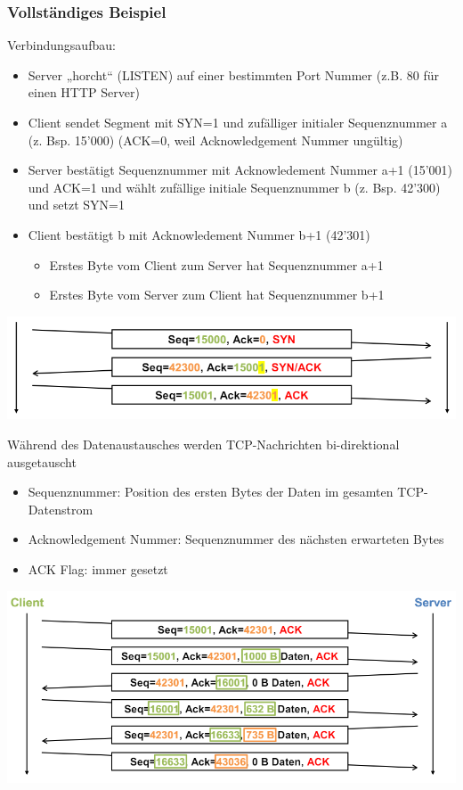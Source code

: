 \subsubsection*{Vollständiges Beispiel}

\begin{example}
    Verbindungsaufbau:
    \begin{itemize}
        \item Server „horcht“ (LISTEN) auf einer bestimmten Port Nummer (z.B. 80 für einen HTTP Server)
        \item Client sendet Segment mit SYN=1 und zufälliger initialer Sequenznummer a (z. Bsp. 15'000) (ACK=0, weil Acknowledgement Nummer ungültig)
        \item Server bestätigt Sequenznummer mit Acknowledement Nummer a+1 (15'001) und ACK=1 und wählt zufällige initiale Sequenznummer b (z. Bsp. 42'300) und setzt SYN=1
        \item Client bestätigt b mit Acknowledement Nummer b+1 (42'301)
        \begin{itemize}
            \item Erstes Byte vom Client zum Server hat Sequenznummer a+1
            \item Erstes Byte vom Server zum Client hat Sequenznummer b+1
        \end{itemize}
    \end{itemize}
        \includegraphics[width=1\linewidth]{images/example_verbindungsaufbau_tcp.png}
\end{example}

\begin{example}
    Während des Datenaustausches werden TCP-Nachrichten bi-direktional ausgetauscht
    \begin{itemize}
        \item Sequenznummer: Position des ersten Bytes der Daten im gesamten TCP-Datenstrom
        \item Acknowledgement Nummer: Sequenznummer des nächsten erwarteten Bytes
        \item ACK Flag: immer gesetzt
    \end{itemize}
        \includegraphics[width=1\linewidth]{images/tcp_datenaustausch_ex.png}
\end{example}

